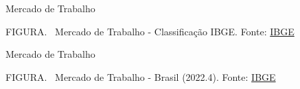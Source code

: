 \documentclass[10pt]{beamer}
\begin{document}
\begin{frame}{Mercado de Trabalho}
    \begin{center}
		\begin{minipage}[b]{.55\textwidth}
			\tiny{{\scshape FIGURA}. \ Mercado de Trabalho - Classificação IBGE. Fonte: \href{https://www.ibge.gov.br/explica/desemprego.php}{IBGE}} 
		\end{minipage}
	\end{center}
\end{frame}

\begin{frame}{Mercado de Trabalho}
    \begin{center}
		\begin{minipage}[b]{.9\textwidth}
			\tiny{{\scshape FIGURA}. \ Mercado de Trabalho - Brasil (2022.4). Fonte: \href{https://www.ibge.gov.br/explica/desemprego.php}{IBGE}} 
		\end{minipage}
	\end{center}
\end{frame}
\end{document}
